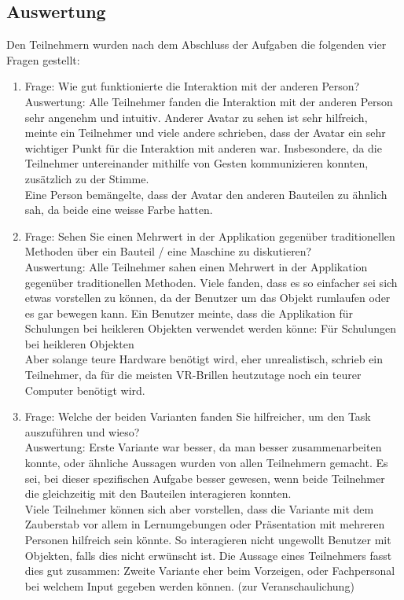\subsection{Auswertung}
Den Teilnehmern wurden nach dem Abschluss der Aufgaben die folgenden vier Fragen gestellt:

\begin{enumerate} [itemsep=1pt,topsep=0pt]
	\item Frage: Wie gut funktionierte die Interaktion mit der anderen Person? \\
	Auswertung: Alle Teilnehmer fanden die Interaktion mit der anderen Person sehr angenehm und intuitiv. \grqq Anderer Avatar zu sehen ist sehr hilfreich\grqq{}, meinte ein Teilnehmer und viele andere schrieben, dass der Avatar ein sehr wichtiger Punkt für die Interaktion mit anderen war. Insbesondere, da die Teilnehmer untereinander mithilfe von Gesten kommunizieren konnten, zusätzlich zu der Stimme.  \\
	Eine Person bemängelte, dass der Avatar den anderen Bauteilen zu ähnlich sah, da beide eine weisse Farbe hatten.
	\item Frage: Sehen Sie einen Mehrwert in der Applikation gegenüber traditionellen Methoden über ein Bauteil / eine Maschine zu diskutieren? \\
	Auswertung: Alle Teilnehmer sahen einen Mehrwert in der Applikation gegenüber traditionellen Methoden. Viele fanden, dass es so einfacher sei sich etwas vorstellen zu können, da der Benutzer um das Objekt rumlaufen oder es gar bewegen kann. Ein Benutzer meinte, dass die Applikation für Schulungen bei heikleren Objekten verwendet werden könne: \grqq Für Schulungen bei heikleren Objekten\grqq{}\\
	\grqq Aber solange teure Hardware benötigt wird, eher unrealistisch\grqq{}, schrieb ein Teilnehmer, da für die meisten VR-Brillen heutzutage noch ein teurer Computer benötigt wird.

	\item Frage: Welche der beiden Varianten fanden Sie hilfreicher, um den Task auszuführen und wieso? \\
	Auswertung: \grqq Erste Variante war besser, da man besser zusammenarbeiten konnte\grqq{}, oder ähnliche Aussagen wurden von allen Teilnehmern gemacht. Es sei, bei dieser spezifischen Aufgabe besser gewesen, wenn beide Teilnehmer die gleichzeitig mit den Bauteilen interagieren konnten.\\
	Viele Teilnehmer können sich aber vorstellen, dass die Variante mit dem Zauberstab vor allem in Lernumgebungen oder Präsentation mit mehreren Personen hilfreich sein könnte. So interagieren nicht ungewollt Benutzer mit Objekten, falls dies nicht erwünscht ist. Die Aussage eines Teilnehmers fasst dies gut zusammen: \grqq Zweite Variante eher beim Vorzeigen, oder Fachpersonal bei welchem Input gegeben werden können. (zur Veranschaulichung)\grqq{} 
	

\end{enumerate}
